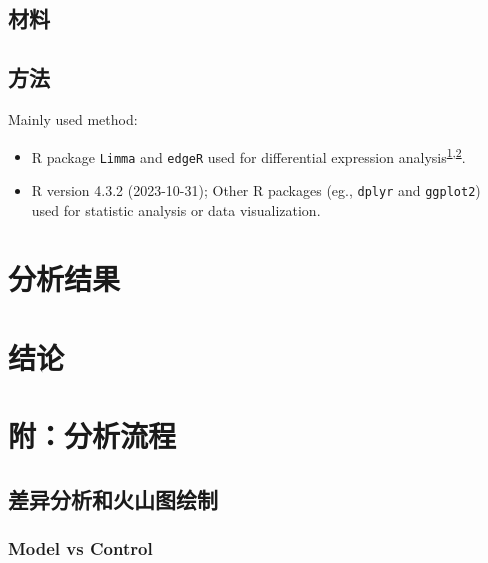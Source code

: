 \documentclass[
]{article}
\providecommand{\tightlist}{%
  \setlength{\itemsep}{0pt}\setlength{\parskip}{0pt}}
\begin{document}
\hypertarget{ux6750ux6599}{%
\subsection{材料}\label{ux6750ux6599}}

\hypertarget{ux65b9ux6cd5}{%
\subsection{方法}\label{ux65b9ux6cd5}}

Mainly used method:

\begin{itemize}
\tightlist
\item
  R package \texttt{Limma} and \texttt{edgeR} used for differential expression analysis\textsuperscript{\protect\hyperlink{ref-LimmaPowersDiRitchi2015}{1},\protect\hyperlink{ref-EdgerDifferenChen}{2}}.
\item
  R version 4.3.2 (2023-10-31); Other R packages (eg., \texttt{dplyr} and \texttt{ggplot2}) used for statistic analysis or data visualization.
\end{itemize}

\hypertarget{results}{%
\section{分析结果}\label{results}}

\hypertarget{dis}{%
\section{结论}\label{dis}}

\hypertarget{workflow}{%
\section{附：分析流程}\label{workflow}}

\hypertarget{ux5deeux5f02ux5206ux6790ux548cux706bux5c71ux56feux7ed8ux5236}{%
\subsection{差异分析和火山图绘制}\label{ux5deeux5f02ux5206ux6790ux548cux706bux5c71ux56feux7ed8ux5236}}

\hypertarget{model-vs-control}{%
\subsubsection{Model vs Control}\label{model-vs-control}}
\end{document}

